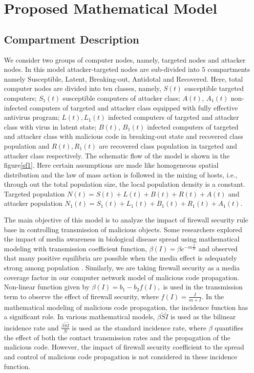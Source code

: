 
\chapter{Proposed Mathematical Model}
\section{Compartment Description}
We consider two groups of computer nodes, namely, targeted nodes and attacker nodes. In this model attacker-targeted nodes are sub-divided into $5$ compartments namely Susceptible, Latent, Breaking-out, Antidotal and Recovered. Here, total computer nodes are divided into ten classes, namely, $S(t)$   susceptible targeted computers; $S_1(t)$ susceptible computers of attacker class; $A(t)$, $A_1(t)$ non-infected computers of targeted and attacker class equipped with fully effective antivirus program; $L(t), L_1(t)$ infected computers of targeted and attacker class with virus in latent state; $B(t)$, $B_1(t)$ infected computers of targeted and attacker class with malicious code in breaking-out state and recovered class population and $R(t), R_1(t)$ are recovered class population in targeted and attacker class respectively. The schematic flow of the model is shown in the figure\ref{sf1}. Here certain assumptions are made like homogeneous spatial distribution and the law of mass action is followed in the mixing of hosts, i.e., through out the total population size, the local population density is a constant. Targeted population $N(t)=S(t)+L(t)+B(t)+R(t)+A(t)$   and attacker population $N_1(t)=S_1(t)+L_1(t)+B_1(t)+R_1(t)+A_1(t)$.

The main objective of this model is to analyze the impact of firewall security rule base in controlling transmission of malicious objects. Some researchers explored the impact of media awareness in biological disease spread using mathematical modeling with transmission coefficient function, $\beta(I)=\beta e^{-m\frac{I}{N}}$ and observed that many positive equilibria are possible when the media effect is adequately strong among population \cite{cui2008impact,liu2008impact,sahu2012,sahu2015dynamics}. Similarly, we are taking firewall security as a media coverage factor in our computer network model of malicious code propagation. Non-linear function given by $\beta(I) = b_1 - b_2 f (I),$ is used in the transmission term to observe the effect of firewall security, where $f(I)=\frac{I}{m+I}$. In the mathematical modeling of malicious code propagation, the incidence function has a significant role. In various mathematical models, $\beta \tilde{S}\tilde{I}$ is used as the bilinear incidence rate  and $\frac{\beta\tilde{S}\tilde{I}}{N}$ is used as the standard incidence rate, where $\beta$ quantifies the effect of both the contact transmission rates and the propagation of the malicious code. However, the impact of firewall security coefficient to the spread and control of malicious code propagation is not considered in these incidence function.


